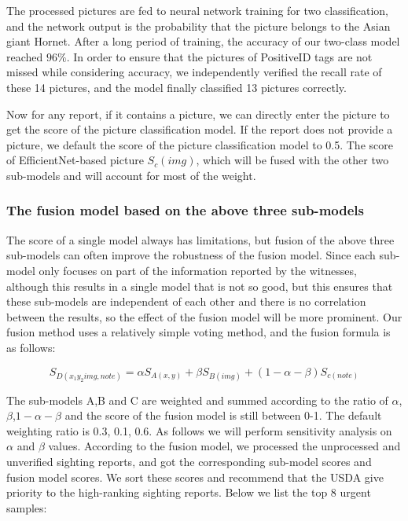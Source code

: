 \documentclass{mcmthesis}
\numberwithin{figure}{section}
\numberwithin{table}{section}
\begin{document}
The processed pictures are fed to neural network training for two classification, and the network output is the probability that the picture belongs to the Asian giant Hornet. After a long period of training, the accuracy of our two-class model reached $96\%$. In order to ensure that the pictures of PositiveID tags are not missed while considering accuracy, we independently verified the recall rate of these 14 pictures, and the model finally classified 13 pictures correctly.

Now for any report, if it contains a picture, we can directly enter the picture to get the score of the picture classification model. If the report does not provide a picture, we default the score of the picture classification model to 0.5. The score of EfficientNet-based picture $S_c(img)$, which will be fused with the other two sub-models and will account for most of the weight.

\subsubsection{The fusion model based on the above three sub-models}

The score of a single model always has limitations, but fusion of the above three sub-models can often improve the robustness of the fusion model. Since each sub-model only focuses on part of the information reported by the witnesses, although this results in a single model that is not so good, but this ensures that these sub-models are independent of each other and there is no correlation between the results, so the effect of the fusion model will be more prominent. Our fusion method uses a relatively simple voting method, and the fusion formula is as follows:

\begin{equation}
  S_{D(x_1 y_2 img,note)} = \alpha S_{A(x,y)}  + \beta S_{B(img)} + (1-\alpha-\beta)S_{c(note)}
\end{equation}

The sub-models A,B and C are weighted and summed according to the ratio of $\alpha$,$\beta$,$1-\alpha-\beta$ and the score of the fusion model is still between 0-1. The default weighting ratio is 0.3, 0.1, 0.6. As follows we will perform sensitivity analysis on  $\alpha$ and $\beta$ values. According to the fusion model, we processed the unprocessed and unverified sighting reports, and got the corresponding sub-model scores and fusion model scores. We sort these scores and recommend that the USDA give priority to the high-ranking sighting reports. Below we list the top 8 urgent samples:
\end{document}
